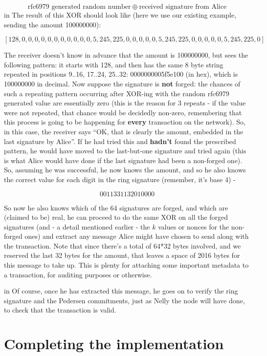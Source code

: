 \documentclass[10pt,a4paper]{article}
\begin{document}
\[\textrm{rfc6979 generated random number}\ \oplus\ \textrm{received signature from Alice} \]
 in \noindent The result of this XOR should look like (here we use our existing example, sending the amount 100000000):

\[ [128,0,0,0,0,0,0,0,0,0,0,0,5,245,225,0,0,0,0,0,5,245,225,0,0,0,0,0,5,245,225,0] \]

The receiver doesn't know in advance that the amount is 100000000, but sees the following pattern: it starts with 128, and then has the same 8 byte string repeated in positions 9..16, 17..24, 25..32: 0000000005f5e100 (in hex), which is 100000000 in decimal. Now suppose the signature is \textbf{not} forged: the chances of such a repeating pattern occurring after XOR-ing with the random rfc6979 generated value are essentially zero (this is the reason for 3 repeats - if the value were not repeated, that chance would be decidedly non-zero, remembering that this process is going to be happening for \textbf{every} transaction on the network). So, in this case, the receiver says ``OK, that is clearly the amount, embedded in the last signature by Alice''. If he had tried this and \textbf{hadn't} found the prescribed pattern, he would have moved to the last-but-one signature and tried again (this is what Alice would have done if the last signature had been a non-forged one). So, assuming he was successful, he now knows the amount, and so he also knows the correct value for each digit in the ring signature (remember, it's base 4) -

\[ 0011331132010000\]

So now he also knows which of the 64 signatures are forged, and which are (claimed to be) real, he can proceed to do the same XOR on all the forged signatures (and - a detail mentioned earlier - the $k$ values or nonces for the non-forged ones) and extract any message Alice might have chosen to send along with the transaction. Note that since there's a total of 64*32 bytes involved, and we reserved the last 32 bytes for the amount, that leaves a space of 2016 bytes for this message to take up. This is plenty for attaching some important metadata to a transaction, for auditing purposes or otherwise.

 in \noindent Of course, once he has extracted this message, he goes on to verify the ring signature and the Pedersen commitments, just as Nelly the node will have done, to check that the transaction is valid.

\section{Completing the implementation}
\end{document}
